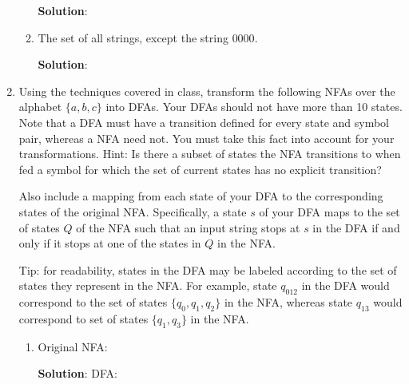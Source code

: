 \documentclass[11pt]{article}
\begin{document}
\begin{enumerate}
\begin{enumerate}
        \textbf{Solution}:

    \item The set of all strings, except the string $0000$.

        \textbf{Solution}:
\end{enumerate}

\newpage

\item Using the techniques covered in class, transform the following NFAs over the alphabet $\{a, b, c\}$ into DFAs. Your DFAs should not have more than 10 states.  Note that a DFA must have a transition defined for every state and symbol pair, whereas a NFA need not. You must take this fact into account for your transformations. Hint: Is there a subset of states the NFA transitions to when fed a symbol for which the set of current states has no explicit transition?

Also include a mapping from each state of your DFA to the corresponding states of the original NFA.  Specifically, a state $s$ of your DFA maps to the set of states $Q$ of the NFA such that an input string stops at $s$ in the DFA if and only if it stops at one of the states in $Q$ in the NFA.

Tip: for readability, states in the DFA may be labeled according to the set of states they represent in the NFA.  For example, state $q_{012}$ in the DFA would correspond to the set of states $\{q_0, q_1, q_2\}$ in the NFA, whereas state $q_{13}$ would correspond to set of states $\{q_1, q_3\}$ in the NFA.

\begin{enumerate}
    \item Original NFA:\\

    \textbf{Solution}: DFA: \\


\end{enumerate}
\end{enumerate}
\end{document}
